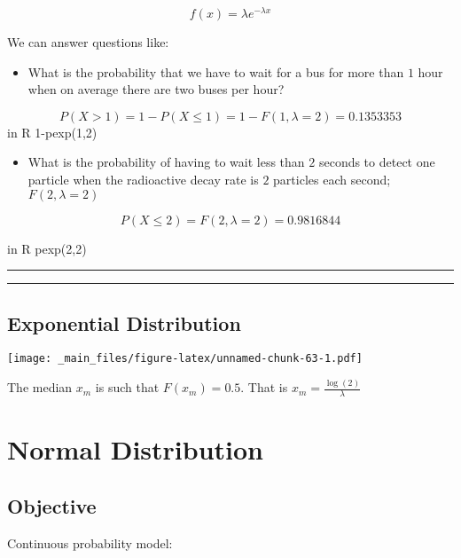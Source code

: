\documentclass[
]{book}
\providecommand{\tightlist}{%
  \setlength{\itemsep}{0pt}\setlength{\parskip}{0pt}}
\begin{document}
\[f(x)=\lambda e^{-\lambda x}\]

We can answer questions like:

\begin{itemize}
\tightlist
\item
  What is the probability that we have to wait for a bus for more than \(1\) hour when on average there are two buses per hour?
\end{itemize}

\[P(X > 1)=1-P(X \le 1) = 1-F(1,\lambda=2)=0.1353353\]
in R 1-pexp(1,2)

\begin{itemize}
\tightlist
\item
  What is the probability of having to wait less than \(2\) seconds to detect one particle when the radioactive decay rate is \(2\) particles each second; \(F(2,\lambda=2)\)
\end{itemize}

\[P(X \le 2)=F(2,\lambda=2)=0.9816844\]

in R pexp(2,2)

\begin{center}\rule{0.5\linewidth}{0.5pt}\end{center}

\begin{center}\rule{0.5\linewidth}{0.5pt}\end{center}

\hypertarget{exponential-distribution-2}{%
\section{Exponential Distribution}\label{exponential-distribution-2}}

\texttt{[image: \_main\_files/figure-latex/unnamed-chunk-63-1.pdf]}

The median \(x_m\) is such that \(F(x_m)=0.5\). That is \(x_m=\frac{\log(2)}{\lambda}\)

\hypertarget{normal-distribution}{%
\chapter{Normal Distribution}\label{normal-distribution}}

\hypertarget{objective-7}{%
\section{Objective}\label{objective-7}}

Continuous probability model:
\end{document}
